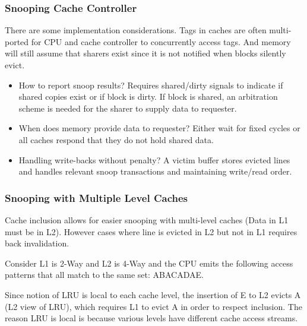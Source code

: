 \documentclass{article}
\begin{document}
\begin{multicols*}{2}
\subsubsection{Snooping Cache Controller}
There are some implementation considerations. Tags in caches are often multi-ported for CPU and cache controller to concurrently access tags. And memory will still assume that sharers exist since it is not notified when blocks silently evict.
\begin{itemize}
    \item How to report snoop results? Requires shared/dirty signals to indicate if shared copies exist or if block is dirty. If block is shared, an arbitration scheme is needed for the sharer to supply data to requester.
    \item When does memory provide data to requester? Either wait for fixed cycles or all caches respond that they do not hold shared data.
    \item Handling write-backs without penalty? A victim buffer stores evicted lines and handles relevant snoop transactions and maintaining write/read order.
\end{itemize}

\subsubsection{Snooping with Multiple Level Caches}
Cache inclusion allows for easier snooping with multi-level caches (Data in L1 must be in L2). However cases where line is evicted in L2 but not in L1 requires back invalidation.
\medskip\par\noindent
Consider L1 is 2-Way and L2 is 4-Way and the CPU emits the following access patterns that all match to the same set: ABACADAE.
\medskip\par\noindent
Since notion of LRU is local to each cache level, the insertion of E to L2 evicts A (L2 view of LRU), which requires L1 to evict A in order to respect inclusion. The reason LRU is local is because various levels have different cache access streams.


\end{multicols*}
\end{document}
